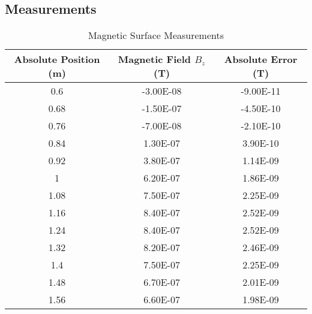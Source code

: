 \begin{appendix}
	\section{Measurements}
	\label{sec:Measurements}
	\begin{table}[H]
		\centering
		\begin{tabular}{c|c|c}
			Absolute Position (m) & Magnetic Field $B_z$ (T) & Absolute Error (T) \\
			\hline\hline
			0.6 & -3.00E-08 & -9.00E-11 \\ \hline
			0.68 & -1.50E-07 & -4.50E-10 \\ \hline
			0.76 & -7.00E-08 & -2.10E-10 \\ \hline
			0.84 & 1.30E-07 & 3.90E-10 \\ \hline
			0.92 & 3.80E-07 & 1.14E-09 \\ \hline
			1 & 6.20E-07 & 1.86E-09 \\ \hline
			1.08 & 7.50E-07 & 2.25E-09 \\ \hline
			1.16 & 8.40E-07 & 2.52E-09 \\ \hline
			1.24 & 8.40E-07 & 2.52E-09 \\ \hline
			1.32 & 8.20E-07 & 2.46E-09 \\ \hline
			1.4 & 7.50E-07 & 2.25E-09 \\ \hline
			1.48 & 6.70E-07 & 2.01E-09 \\ \hline
			1.56 & 6.60E-07 & 1.98E-09 \\ \hline
		\end{tabular}
		\caption{Magnetic Surface Measurements}
		\label{tab:Magnetic_Surface_Measurements}
	\end{table}


\end{appendix}
